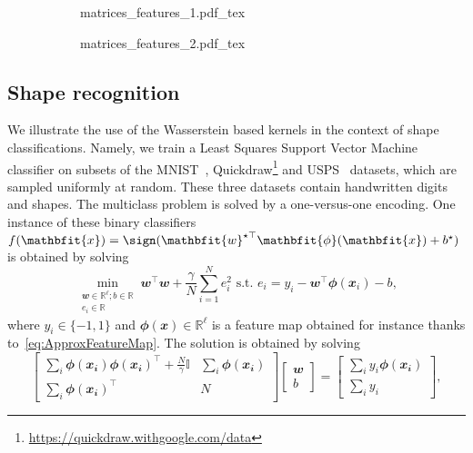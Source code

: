 \begin{figure}
    \centering
    \begin{subfigure}{.45\textwidth}
        \centering
        \def\svgwidth{\textwidth}\footnotesize
        {matrices_features_1.pdf_tex}
        \caption{}
    \end{subfigure}
    \hfill
    \begin{subfigure}{.45\textwidth}
        \centering
        \def\svgwidth{\textwidth}\footnotesize
        {matrices_features_2.pdf_tex}
        \caption{}
    \end{subfigure}
    \caption[]{}
\end{figure}

\subsection{Shape recognition}
We illustrate the use of the Wasserstein based kernels in the context of shape classifications. Namely, we train a Least Squares Support Vector Machine~\cite{LSSVM} classifier on  subsets of the MNIST~\cite{lecun-mnisthandwrittendigit-2010}, Quickdraw\footnote{\url{https://quickdraw.withgoogle.com/data}} and USPS~\cite{USPS} datasets, which are sampled uniformly at random.
These three datasets contain handwritten digits and shapes.
The multiclass problem is solved by a one-versus-one encoding. One instance of these binary classifiers $f(\mathbfit{x}) = \sign( \mathbfit{w}^{\star\top}\mathbfit{\phi}(\mathbfit{x}) +b^\star)$ is obtained by solving
\begin{equation}
\min_{\substack{\mathbfit{w}\in \mathbb{R}^\ell;b\in \mathbb{R}\\
e_i\in \mathbb{R}}}\mathbfit{w}^\top\mathbfit{w} + \frac{\gamma}{N}\sum_{i=1}^{N} e_i^2 \text{ s.t. } e_i = y_i-\mathbfit{w}^\top\mathbfit{\phi}(\mathbfit{x}_i) -b, \label{eq:primal}
\end{equation}
where $y_i\in \{-1,1\}$ and $\mathbfit{\phi}(\mathbfit{x})\in \mathbb{R}^\ell$ is a feature map obtained for instance thanks to~\eqref{eq:ApproxFeatureMap}.
The solution is obtained by solving
\begin{equation*}
\begin{bmatrix}
        \sum_{i}\mathbfit{\phi}(\mathbfit{x_i})\mathbfit{\phi}(\mathbfit{x_i})^\top + \frac{N}{\gamma}\mathbb{I} & \sum_{i}\mathbfit{\phi}(\mathbfit{x_i})\\
    \sum_{i}\mathbfit{\phi}(\mathbfit{x_i})^\top & N
\end{bmatrix}
\begin{bmatrix}
\mathbfit{w}\\
b
\end{bmatrix}
 = \begin{bmatrix}
\sum_{i}y_i\mathbfit{\phi}(\mathbfit{x_i})\\
\sum_{i}y_i
\end{bmatrix},
\end{equation*}
